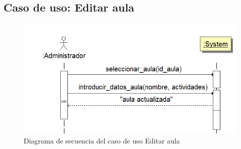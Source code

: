 \documentclass{book}
\begin{document}
\subsection{Caso de uso: Editar aula}
\begin{figure}[H] 
  \label{comportamiento-editar-aula} 
	\begin{center}
    \includegraphics[scale=0.5]{./secuencia-editar-aula.png}
  \end{center}
\caption{Diagrama de secuencia del caso de uso Editar aula}
\end{figure}

\end{document}
